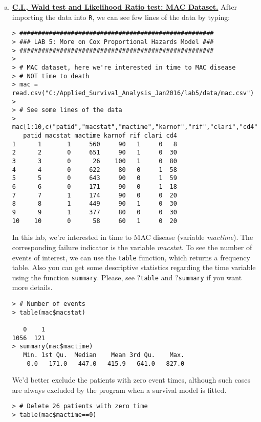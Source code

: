 \begin{enumerate}[(a)]
\item \textbf{\underline{C.I., Wald test and Likelihood Ratio test: MAC Dataset.}} After importing the data into \verb|R|, we can see few lines of the data by typing:
\begin{footnotesize}
\begin{verbatim}
> #####################################################
> ### LAB 5: More on Cox Proportional Hazards Model ###
> #####################################################
> 
> # MAC dataset, here we're interested in time to MAC disease
> # NOT time to death
> mac = read.csv("C:/Applied_Survival_Analysis_Jan2016/lab5/data/mac.csv")
> 
> # See some lines of the data
> mac[1:10,c("patid","macstat","mactime","karnof","rif","clari","cd4")]
   patid macstat mactime karnof rif clari cd4
1      1       1     560     90   1     0   8
2      2       0     651     90   1     0  30
3      3       0      26    100   1     0  80
4      4       0     622     80   0     1  58
5      5       0     643     90   0     1  59
6      6       0     171     90   0     1  18
7      7       1     174     90   0     0  20
8      8       1     449     90   1     0  30
9      9       1     377     80   0     0  30
10    10       0      58     60   1     0  20
\end{verbatim}
\end{footnotesize}
In this lab, we're interested in time to MAC disease (variable \emph{mactime}). The corresponding failure indicator is the variable \emph{macstat}. To see the number of events of interest, we can use the \verb|table| function, which returns a frequency table. Also you can get some descriptive statistics regarding the time variable using the function \verb|summary|. Please, see ?\verb|table| and ?\verb|summary| if you want more details.
\begin{footnotesize}
\begin{verbatim}
> # Number of events
> table(mac$macstat)

   0    1 
1056  121 
> summary(mac$mactime)
   Min. 1st Qu.  Median    Mean 3rd Qu.    Max. 
    0.0   171.0   447.0   415.9   641.0   827.0 
\end{verbatim}
\end{footnotesize}
We'd better exclude the patients with zero event times, although such cases are always excluded by the program when a survival model is fitted.
\begin{footnotesize}
\begin{verbatim}
> # Delete 26 patients with zero time
> table(mac$mactime==0)


\end{verbatim}
\end{footnotesize}
\end{enumerate}
